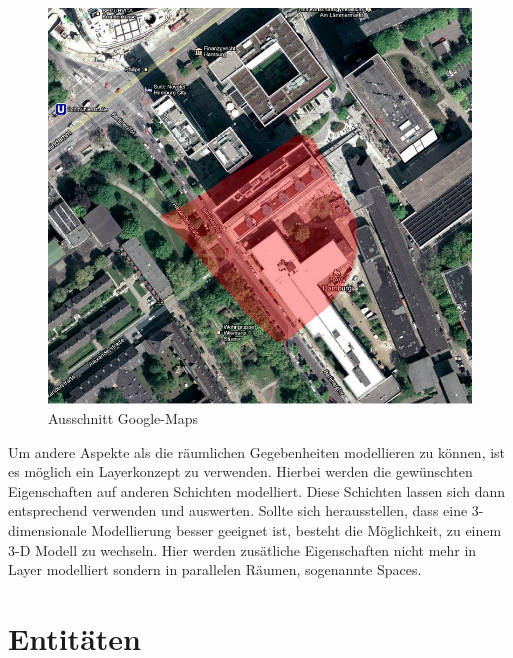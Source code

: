 \documentclass[10pt]{scrartcl}
\begin{document}
        
      \begin{figure}[htbp]
        \centering
                \includegraphics[scale=0.5]{img/google_maps}
        \caption{Ausschnitt Google-Maps}
        \label{img:google_maps}
        \end{figure}  
        
        
        Um andere Aspekte als die räumlichen Gegebenheiten modellieren zu können, ist es möglich ein Layerkonzept zu verwenden. Hierbei werden die gewünschten Eigenschaften auf anderen Schichten modelliert. Diese Schichten lassen sich dann entsprechend verwenden und auswerten.
Sollte sich herausstellen, dass eine 3-dimensionale Modellierung besser geeignet ist, besteht die Möglichkeit, zu einem 3-D Modell zu wechseln. Hier werden zusätliche Eigenschaften nicht mehr in Layer modelliert sondern in parallelen Räumen, sogenannte Spaces.

\section{Entitäten}
\end{document}

